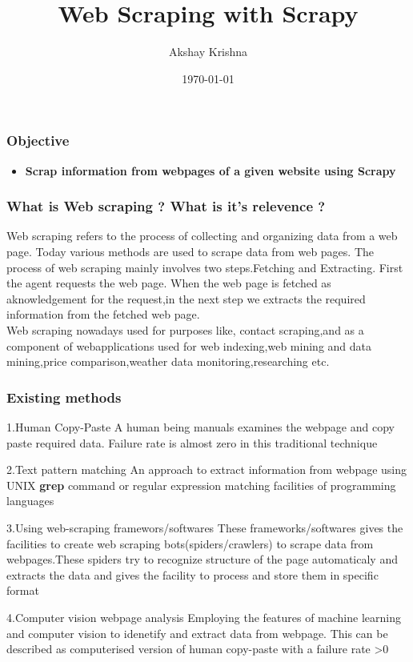 \documentclass{beamer}
\title[Short title]{Web Scraping with Scrapy} %
\author{Akshay Krishna} %
\institute[] %
{
S5 CSE A \\ %
\medskip
\textit{} %
}
\date{\today} %
\begin{document}
\begin{frame}
\titlepage %
\end{frame}

\begin{frame}
\frametitle{Objective}
\begin{itemize}
\item \textbf {Scrap information from webpages of a given website using Scrapy}
\end{itemize}
\end{frame}

\begin{frame}
\frametitle{What is Web scraping ? What is it's relevence ?}
Web scraping refers to the process of collecting and organizing data from a web page. Today various methods are used to scrape data from web pages. The process of web scraping mainly involves two steps.Fetching and Extracting. First the agent requests the web page. When the web page is fetched as aknowledgement for the request,in the next step we extracts the required information from the fetched web page.
\\
Web scraping nowadays used for purposes like, contact scraping,and as a component of webapplications used for web indexing,web mining and data mining,price comparison,weather data monitoring,researching etc.
\end{frame}

\begin{frame}
\frametitle{Existing methods}
\begin{block}{1.Human Copy-Paste}
A human being manuals examines the webpage and copy paste required data. Failure rate is almost zero in this traditional technique
\end{block}
\begin{block}{2.Text pattern matching}
An approach to extract information from webpage using UNIX \textbf{grep} command or regular expression matching facilities of programming languages
\end{block}
\end{frame}

\begin{frame}
\begin{block}{3.Using web-scraping framewors/softwares}
These frameworks/softwares gives the facilities to create web scraping bots(spiders/crawlers) to scrape data from webpages.These spiders try to recognize structure of the page automaticaly and extracts the data and gives the facility to process and store them in specific format
\end{block}

\begin{block}{4.Computer vision webpage analysis}
Employing the features of machine learning and computer vision to idenetify and extract data from webpage. This can be described as computerised version of human copy-paste with a failure rate >0
\end{block}
\end{frame}
\end{document}

